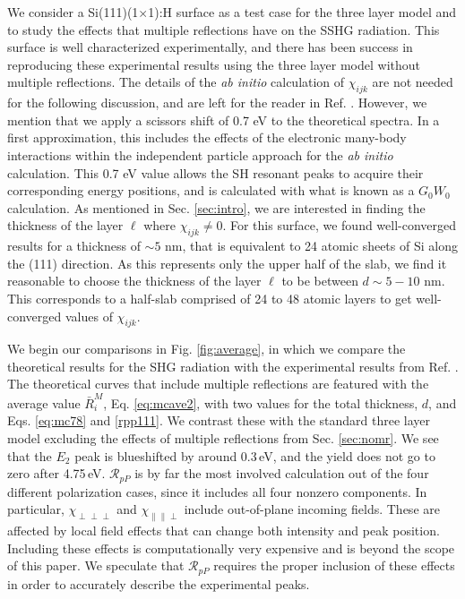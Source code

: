 We consider a Si(111)(1$\times$1):H surface as a test case for the three layer model and to study the effects that multiple reflections have on the SSHG radiation. This surface is well characterized experimentally,\cite{mitchellSS01, mejiaPRB02, bergfeldPRL04} and there has been success in reproducing these experimental results using the three layer model without multiple reflections.\cite{andersonPRB16} The details of the \emph{ab initio} calculation of $\chi_{ijk}$ are not needed for the following discussion, and are left for the reader in Ref. \cite{andersonPRB16}. However, we mention that we apply a scissors shift of 0.7 eV to the theoretical spectra. In a first approximation, this includes the effects of the electronic many-body interactions within the independent particle approach for the \emph{ab initio} calculation. This 0.7 eV value allows the SH resonant peaks to acquire their corresponding energy positions, and is calculated with what is known as a $G_{0}W_{0}$ calculation.\cite{andersonPRB16} As mentioned in Sec. \ref{sec:intro}, we are interested in finding the thickness of the layer $\ell$ where $\chi_{ijk} \ne 0$. For this surface, we found well-converged results for a thickness of $\sim 5$ nm, that is equivalent to 24 atomic sheets of Si along the (111) direction. As this represents only the upper half of the slab, we find it reasonable to choose the thickness of the layer $\ell$ to be between $d\sim 5-10$ nm. This corresponds to a half-slab comprised of 24 to 48 atomic layers to get well-converged values of $\chi_{ijk}$.

We begin our comparisons in Fig. \ref{fig:average}, in which we compare the theoretical results for the SHG radiation with the experimental results from Ref. \cite{mejiaPRB02}. The theoretical curves that include multiple reflections are featured with the average value $\bar{R}^{M}_{i}$, Eq. \eqref{eq:mcave2}, with two values for the total thickness, $d$, and Eqs. \eqref{eq:mc78} and \eqref{rpp111}. We contrast these with the standard three layer model excluding the effects of multiple reflections from Sec. \ref{sec:nomr}. We see that the $E_{2}$ peak is blueshifted by around 0.3\,eV, and the yield does not go to zero after 4.75\,eV. $\mathcal{R}_{pP}$ is by far the most involved calculation out of the four different polarization cases, since it includes all four nonzero components. In particular, $\chi_{\perp\perp\perp}$ and $\chi_{\parallel\parallel\perp}$ include out-of-plane incoming fields. These are affected by local field effects that can change both intensity and peak position.\cite{tancognedejean:tel-01235611} Including these effects is computationally very expensive and is beyond the scope of this paper. We speculate that $\mathcal{R}_{pP}$ requires the proper inclusion of these effects in order to accurately describe the experimental peaks.

